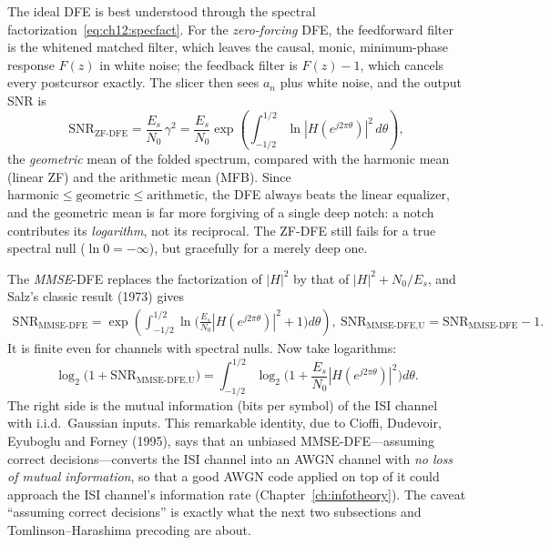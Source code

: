 The ideal DFE is best understood through the spectral factorization~\eqref{eq:ch12:specfact}. For
the \emph{zero-forcing} DFE, the feedforward filter is the whitened matched filter, which leaves the
causal, monic, minimum-phase response $F(z)$ in white noise; the feedback filter is $F(z)-1$, which
cancels every postcursor exactly. The slicer then sees $a_n$ plus white noise, and the output SNR is
\begin{equation}
\mathrm{SNR}_{\text{ZF-DFE}}=\frac{E_s}{N_0}\,\gamma^2=\frac{E_s}{N_0}\exp\!\left(\int_{-1/2}^{1/2}\ln|H(e^{j2\pi\theta})|^2\,d\theta\right),
\label{eq:ch12:zfdfe}
\end{equation}
the \emph{geometric} mean of the folded spectrum, compared with the harmonic mean (linear ZF) and the
arithmetic mean (MFB). Since $\text{harmonic}\le\text{geometric}\le\text{arithmetic}$, the DFE always
beats the linear equalizer, and the geometric mean is far more forgiving of a single deep notch:
a notch contributes its \emph{logarithm}, not its reciprocal. The ZF-DFE still fails for a true
spectral null ($\ln 0=-\infty$), but gracefully for a merely deep one.


The \emph{MMSE}-DFE replaces the factorization of $|H|^2$ by that of $|H|^2+N_0/E_s$, and Salz's
classic result (1973) gives
\begin{equation}
\begin{gathered}
\mathrm{SNR}_{\text{MMSE-DFE}}=\exp\!\left(\int_{-1/2}^{1/2}\ln\!\Big(\frac{E_s}{N_0}|H(e^{j2\pi\theta})|^2+1\Big)d\theta\right),\
\mathrm{SNR}_{\text{MMSE-DFE,U}}=\mathrm{SNR}_{\text{MMSE-DFE}}-1 .
\end{gathered}
\label{eq:ch12:mmsedfe}
\end{equation}
It is finite even for channels with spectral nulls. Now take logarithms:
\begin{equation}
\log_2\!\big(1+\mathrm{SNR}_{\text{MMSE-DFE,U}}\big)=\int_{-1/2}^{1/2}\log_2\!\Big(1+\frac{E_s}{N_0}|H(e^{j2\pi\theta})|^2\Big)d\theta .
\label{eq:ch12:cdefg}
\end{equation}
The right side is the mutual information (bits per symbol) of the ISI channel with i.i.d.\ Gaussian
inputs. This remarkable identity, due to Cioffi, Dudevoir, Eyuboglu and Forney (1995), says that an
unbiased MMSE-DFE---assuming correct decisions---converts the ISI channel into an AWGN channel with
\emph{no loss of mutual information}, so that a good AWGN code applied on top of it could approach
the ISI channel's information rate (Chapter~\ref{ch:infotheory}). The caveat ``assuming correct
decisions'' is exactly what the next two subsections and Tomlinson--Harashima precoding are about.

